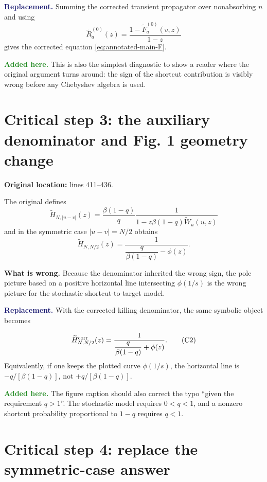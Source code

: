 \documentclass[11pt]{article}
\newcommand{\wt}{\widetilde}
\newcommand{\Issue}[1]{\par\smallskip\noindent\textbf{\textcolor{BrickRed}{What is wrong.}} #1\par}
\newcommand{\Fix}[1]{\par\smallskip\noindent\textbf{\textcolor{MidnightBlue}{Replacement.}} #1\par}
\newcommand{\Added}[1]{\par\smallskip\noindent\textbf{\textcolor{ForestGreen}{Added here.}} #1\par}
\begin{document}
\Fix{Summing the corrected transient propagator over nonabsorbing $n$ and
using
\[
  \wt R_a^{(0)}(z)=\frac{1-\wt F_a^{(0)}(v,z)}{1-z}
\]
gives the corrected equation \eqref{eq:annotated-main-F}.}

\Added{This is also the simplest diagnostic to show a reader where the original
argument turns around: the sign of the shortcut contribution is visibly wrong
before any Chebyshev algebra is used.}

\section{Critical step 3: the auxiliary denominator and Fig. 1 geometry change}

\textbf{Original location:} lines 411--436.

The original defines
\begingroup\color{BrickRed}
\begin{equation}
\wt H_{N,|u-v|}(z)
=\frac{\beta(1-q)}{q}
\frac{1}{1-z\beta(1-q)\wt W_u(u,z)}
\tag{O4}
\end{equation}
\endgroup
and in the symmetric case $|u-v|=N/2$ obtains
\begingroup\color{BrickRed}
\begin{equation}
  \wt H_{N,N/2}(z)
  =\frac{1}{\dfrac{q}{\beta(1-q)}-\phi(z)}.
\tag{O5}
\end{equation}
\endgroup

\Issue{Because the denominator inherited the wrong sign, the pole picture based
on a positive horizontal line intersecting $\phi(1/s)$ is the wrong picture for
the stochastic shortcut-to-target model.}

\Fix{With the corrected killing denominator, the same symbolic object becomes}
\begingroup\color{MidnightBlue}
\begin{equation}
  \wt H^{\rm corr}_{N,N/2}(z)
  =\frac{1}{\dfrac{q}{\beta(1-q)}+\phi(z)}.
\tag{C2}
\end{equation}
\endgroup
Equivalently, if one keeps the plotted curve $\phi(1/s)$, the horizontal line
is $-q/[\beta(1-q)]$, not $+q/[\beta(1-q)]$.

\Added{The figure caption should also correct the typo ``given the requirement
$q>1$''.  The stochastic model requires $0<q<1$, and a nonzero shortcut
probability proportional to $1-q$ requires $q<1$.}

\section{Critical step 4: replace the symmetric-case answer}
\end{document}
